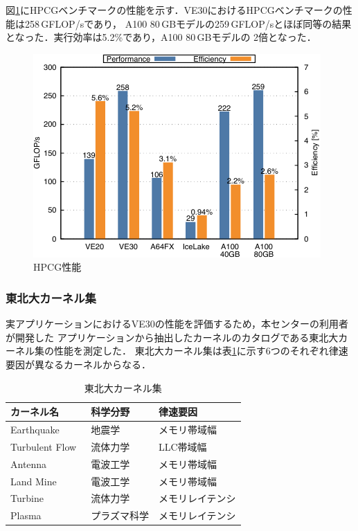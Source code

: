 ﻿\documentclass[submit,techrep,noauthor]{ipsj}
\begin{document}
図\ref{fig:hpcg}にHPCGベンチマークの性能を示す．VE30におけるHPCGベンチマークの性能は258\,GFLOP/sであり，
A100 80\,GBモデルの259\,GFLOP/sとほぼ同等の結果となった．実行効率は5.2\%であり，A100 80\,GBモデルの
2倍となった．

\begin{figure}[tb]
  \centering
  \includegraphics{figs/hpcg.pdf}
  \caption{HPCG性能~\cite{Takahashi2023}}\label{fig:hpcg}
\end{figure}

\subsubsection{東北大カーネル集}

実アプリケーションにおけるVE30の性能を評価するため，本センターの利用者が開発した
アプリケーションから抽出したカーネルのカタログである東北大カーネル集の性能を測定した．
東北大カーネル集は表\ref{tbl:isc-kernels}に示す6つのそれぞれ律速要因が異なるカーネルからなる．

\begin{table}[tb]
\caption{東北大カーネル集}\label{tbl:isc-kernels}
\begin{tabular}{@{}lll@{}}
\toprule
カーネル名                          & 科学分野        & 律速要因            \\ \midrule
Earthquake~\cite{Ariyoshi2007}      & 地震学          & メモリ帯域幅        \\
Turbulent Flow~\cite{Tsukahara2007} & 流体力学        & LLC帯域幅           \\
Antenna~\cite{Sato2011}             & 電波工学        & メモリ帯域幅        \\
Land Mine~\cite{Sato2003}           & 電波工学        & メモリ帯域幅        \\
Turbine~\cite{Tsukahara2007}        & 流体力学        & メモリレイテンシ    \\
Plasma~\cite{Katoh2005}             & プラズマ科学    & メモリレイテンシ    \\ \bottomrule
\end{tabular}
\end{table}
\end{document}
